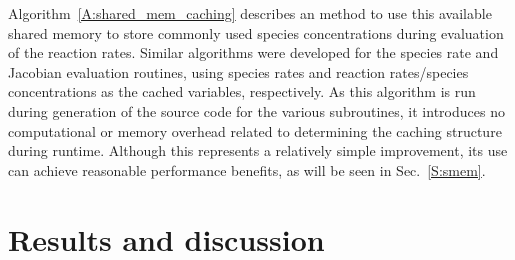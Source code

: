 \documentclass[preprint]{elsarticle}
\begin{document}
Algorithm~\ref{A:shared_mem_caching} describes an method to use this available shared memory to store commonly used species concentrations during evaluation of the reaction rates. 
Similar algorithms were developed for the species rate and Jacobian evaluation routines, using species rates and reaction rates\slash species concentrations as the cached variables, respectively.
As this algorithm is run during generation of the source code for the various subroutines, it introduces no computational or memory overhead related to determining the caching structure during runtime.
Although this represents a relatively simple improvement, its use can achieve reasonable performance benefits, as will be seen in Sec.~\ref{S:smem}.

\section{Results and discussion}
\end{document}
